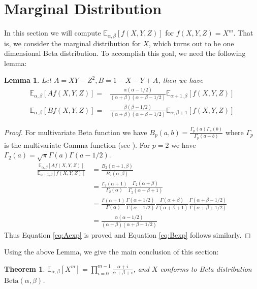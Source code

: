 \documentclass{elsarticle}
\newtheorem{theorem}{Theorem}
\newtheorem{lemma}{Lemma}
\def\E{\mathbb{E}}
\def\Beta{\textrm{Beta}}
\begin{document}
\section{Marginal Distribution}
In this section we will compute $\E_{\alpha,\beta}[f(X,Y, Z)]$
for $f(X,Y,Z)=X^m$. That is, we consider the marginal distribution for $X$,
which turns out to be one dimensional Beta distribution.
To accomplish this goal, we need the following lemma:
\begin{lemma}\label{lem:AB}
	Let $A = XY - Z^2, B = 1 - X - Y + A$, then we have
	\begin{align}
	\E_{\alpha, \beta}[Af(X,Y,Z)] =&
	\frac{\alpha(\alpha-1/2)}{(\alpha+\beta)(\alpha+\beta-1/2)}\E_{\alpha+1, \beta}[f(X,Y,Z)]
	\label{eq:Aexp} \\
	\E_{\alpha,\beta}[Bf(X,Y,Z)] =&
	\frac{\beta(\beta-1/2)}{(\alpha+\beta)(\alpha+\beta-1/2)}\E_{\alpha, \beta+1}[f(X,Y,Z)]
	\label{eq:Bexp}
	\end{align}
\end{lemma}
\begin{proof}
	For multivariate Beta function we have
	$B_p(a, b) = \frac{\Gamma_p(a)\Gamma_p(b)}{\Gamma_p(a+b)}$
	where $\Gamma_p$ is the multivariate Gamma function (see \cite{ingham_1933}).
	For $p=2$ we have $\Gamma_2(a) = \sqrt{\pi}\Gamma(a)\Gamma(a-1/2)$.
	\begin{align*}
	\frac{\E_{\alpha, \beta}[Af(X,Y,Z)]}{\E_{\alpha+1, \beta}[f(X,Y,Z)]} &
	=\frac{B_2(\alpha+1,\beta)}{B_2(\alpha,\beta)}\\
	&=\frac{\Gamma_2(\alpha+1)}{\Gamma_2(\alpha)}
	\frac{\Gamma_2(\alpha+\beta)}{\Gamma_2(\alpha+\beta+1)}\\
	& =\frac{\Gamma(\alpha+1)}{\Gamma(\alpha)}
	\frac{\Gamma(\alpha+1/2)}{\Gamma(\alpha-1/2)}
	\frac{\Gamma(\alpha+\beta)}{\Gamma(\alpha+\beta+1)}
	\frac{\Gamma(\alpha+\beta-1/2)}{\Gamma(\alpha+\beta+1/2)}\\
	&=\frac{\alpha(\alpha-1/2)}{(\alpha+\beta)(\alpha+\beta-1/2)}
	\end{align*}
	Thus Equation \eqref{eq:Aexp} is proved and Equation \eqref{eq:Bexp} follows similarly.
\end{proof}
Using the above Lemma, we give the main conclusion of this section:
\begin{theorem}\label{thm:Xm}
	$\E_{\alpha, \beta}[X^m] =
	\prod_{i=0}^{m-1}\frac{\alpha+i}{\alpha+\beta+i}$, and $X$
	conforms to Beta distribution $\Beta(\alpha, \beta)$.
\end{theorem}
\end{document}
